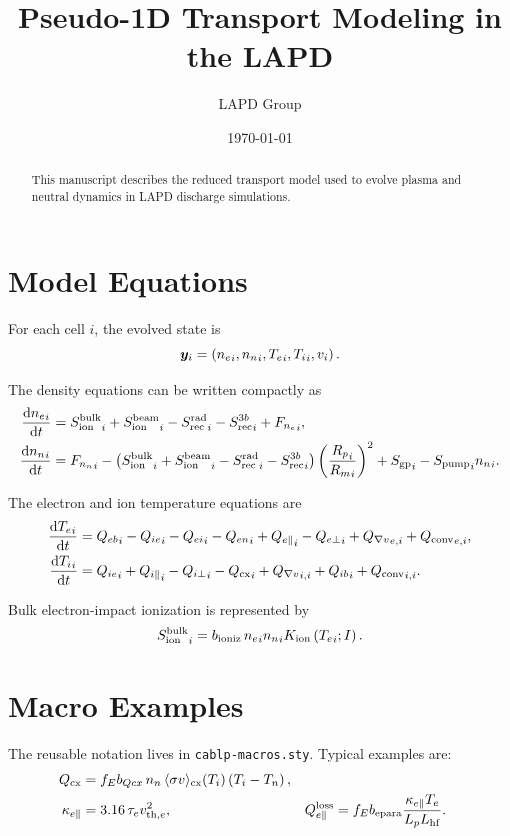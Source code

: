 \documentclass[11pt]{article}
\title{\textbf{Pseudo-1D Transport Modeling in the LAPD}}
\author{LAPD Group}
\date{\today}
\begin{document}
\maketitle

\begin{abstract}
This manuscript describes the reduced transport model used to evolve plasma
and neutral dynamics in LAPD discharge simulations.
\end{abstract}

\section{Model Equations}

For each cell $i$, the evolved state is
\begin{equation}
  \bm{y}_i = \left( {n_e}_{i}, {n_n}_{i}, {T_e}_{i},
  {T_i}_{i}, {v}_{i} \right).
\end{equation}

The density equations can be written compactly as
\begin{align}
  \frac{\mathop{}\!\mathrm{d} {n_e}_{i}}{\mathop{}\!\mathrm{d} t}
    &= {S_{\mathrm{ion}}^{\mathrm{bulk}}}_{i}
     + {S_{\mathrm{ion}}^{\mathrm{beam}}}_{i}
     - {S_{\mathrm{rec}}^{\mathrm{rad}}}_{i}
     - {S_{\mathrm{rec}}^{3b}}_{i}
     + {F_{n_e}}_{i}, \\
  \frac{\mathop{}\!\mathrm{d} {n_n}_{i}}{\mathop{}\!\mathrm{d} t}
    &= {F_{n_n}}_{i}
     - \left( {S_{\mathrm{ion}}^{\mathrm{bulk}}}_{i} + {S_{\mathrm{ion}}^{\mathrm{beam}}}_{i}
       - {S_{\mathrm{rec}}^{\mathrm{rad}}}_{i} - {S_{\mathrm{rec}}^{3b}}_{i} \right)
       \left( \frac{{R_p}_{i}}{{R_m}_{i}} \right)^2
     + {S_{\mathrm{gp}}}_{i}
     - {S_{\mathrm{pump}}}_{i}{n_n}_{i}.
\end{align}

The electron and ion temperature equations are
\begin{align}
  \frac{\mathop{}\!\mathrm{d} {T_e}_{i}}{\mathop{}\!\mathrm{d} t}
    &= {Q_{eb}}_{i}
     - {Q_{ie}}_{i}
     - {Q_{ei}}_{i}
     - {Q_{en}}_{i}
     + {Q_{e\parallel}}_{i}
     - {Q_{e\perp}}_{i}
     + {Q_{\nabla v}}_{e,i}
     + {Q_{\mathrm{conv}}}_{e,i}, \\
  \frac{\mathop{}\!\mathrm{d} {T_i}_{i}}{\mathop{}\!\mathrm{d} t}
    &= {Q_{ie}}_{i}
     + {Q_{i\parallel}}_{i}
     - {Q_{i\perp}}_{i}
     - {Q_{\mathrm{cx}}}_{i}
     + {Q_{\nabla v}}_{i,i}
     + {Q_{ib}}_{i}
     + {Q_{\mathrm{conv}}}_{i,i}.
\end{align}

Bulk electron-impact ionization is represented by
\begin{equation}
  {S_{\mathrm{ion}}^{\mathrm{bulk}}}_{i}
    = b_{\mathrm{ioniz}}\,{n_e}_{i}{n_n}_{i}
      K_{\mathrm{ion}}\left( {T_e}_{i}; I \right).
\end{equation}

\section{Macro Examples}

The reusable notation lives in \texttt{cablp-macros.sty}.  Typical examples are:
\begin{align}
  Q_{\mathrm{cx}} &= f_E b_{Qcx}\,n_n\,\langle\sigma v\rangle_{\mathrm{cx}}(T_i)\left( T_i-T_n \right), \\
  \kappa_{e\parallel} &= 3.16\,\tau_e v_{\mathrm{th},e}^2, &
  Q_{e\parallel}^{\mathrm{loss}}
    &= f_E b_{\mathrm{epara}}\frac{\kappa_{e\parallel}T_e}{L_pL_{\mathrm{hf}}}.
\end{align}
\end{document}
